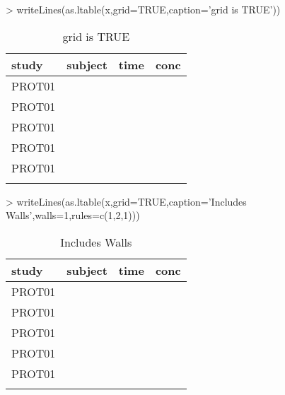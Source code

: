 \documentclass[titlepage]{article}
\begin{document}
\begin{Schunk}
\begin{Sinput}
> writeLines(as.ltable(x,grid=TRUE,caption='grid is TRUE'))
\end{Sinput}
\begin{table}[H]
 \caption[grid is TRUE]{grid is TRUE }
 \begin{center}
  \begin{tabular}{l|r|r|r}
    \hline \hline
   study & subject & time & conc \\ \hline
   PROT01 & \verb#1001# & \verb#0# & \verb#0.12# \\ \hline
   PROT01 & \verb#1001# & \verb#1# & \verb#34.00# \\ \hline
   PROT01 & \verb#1001# & \verb#2# & \verb#5.60# \\ \hline
   PROT01 & \verb#1002# & \verb#0# & \verb#0.50# \\ \hline
   PROT01 & \verb#1002# & \verb#1# & \verb#200.00# \\ \hline
    & \verb#1002# & \verb#2# & \verb## \\ \hline
  \end{tabular}
 \end{center}
\end{table}\end{Schunk}
\begin{Schunk}
\begin{Sinput}
> writeLines(as.ltable(x,grid=TRUE,caption='Includes Walls',walls=1,rules=c(1,2,1)))
\end{Sinput}
\begin{table}[H]
 \caption[Includes Walls]{Includes Walls }
 \begin{center}
  \begin{tabular}{|l|r|r|r|}
    \hline
   study & subject & time & conc \\ \hline \hline
   PROT01 & \verb#1001# & \verb#0# & \verb#0.12# \\ \hline
   PROT01 & \verb#1001# & \verb#1# & \verb#34.00# \\ \hline
   PROT01 & \verb#1001# & \verb#2# & \verb#5.60# \\ \hline
   PROT01 & \verb#1002# & \verb#0# & \verb#0.50# \\ \hline
   PROT01 & \verb#1002# & \verb#1# & \verb#200.00# \\ \hline
    & \verb#1002# & \verb#2# & \verb## \\ \hline
  \end{tabular}
 \end{center}
\end{table}\end{Schunk}
\end{document}
